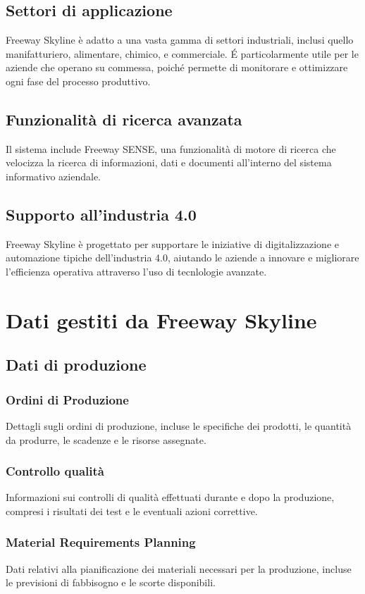 \documentclass{article}
\begin{document}
\subsection{Settori di applicazione}
Freeway Skyline è adatto a una vasta gamma di settori industriali, inclusi quello manifatturiero, alimentare, chimico, e commerciale. É particolarmente utile per le aziende che operano su commessa, poiché permette di monitorare e ottimizzare ogni fase del processo produttivo.
\subsection{Funzionalità di ricerca avanzata}
Il sistema include Freeway SENSE, una funzionalità di motore di ricerca che velocizza la ricerca di informazioni, dati e documenti all'interno del sistema informativo aziendale.
\subsection{Supporto all'industria 4.0}
Freeway Skyline è progettato per supportare le iniziative di digitalizzazione e automazione tipiche dell'industria 4.0, aiutando le aziende a innovare e migliorare l'efficienza operativa attraverso l'uso di tecnlologie avanzate.

\section{Dati gestiti da Freeway Skyline}

\subsection{Dati di produzione}

\subsubsection{Ordini di Produzione}
Dettagli sugli ordini di produzione, incluse le specifiche dei prodotti, le quantità da produrre, le scadenze e le risorse assegnate.
\subsubsection{Controllo qualità}
Informazioni sui controlli di qualità effettuati durante e dopo la produzione, compresi i risultati dei test e le eventuali azioni correttive.
\subsubsection{Material Requirements Planning}
Dati relativi alla pianificazione dei materiali necessari per la produzione, incluse le previsioni di fabbisogno e le scorte disponibili.
\end{document}
